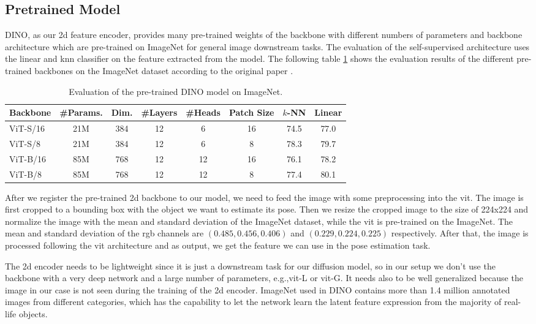 \documentclass[12pt,DIV14,BCOR12mm,a4paper,footinclude=false,headinclude,parskip=half-,twoside,openright,cleardoublepage=empty,toc=index,bibliography=totoc,listof=totoc]{scrreprt}
\numberwithin{equation}{chapter}
\begin{document}
\subsection{Pretrained Model} 
DINO, as our \gls{2d} feature encoder, provides many pre-trained weights of the backbone with different numbers of parameters and backbone architecture which are pre-trained on ImageNet for general image downstream tasks. The evaluation of the self-supervised architecture uses the linear and \gls{knn} classifier on the feature extracted from the model. The following table \ref{tab:dino} shows the evaluation results of the different pre-trained backbones on the ImageNet dataset according to the original paper \cite{caron2021emerging}.
\begin{table}[ht]
  \centering
  \caption{Evaluation of the pre-trained DINO model on ImageNet.}
  \label{tab:dino}
  \begin{tabular}{l | c c c c c c c}
      \toprule
      Backbone & \#Params. & Dim. & \#Layers & \#Heads & Patch Size & $k$-NN & Linear\\
      \midrule
      ViT-S/16 & 21M & 384 & 12 & 6 & 16 & 74.5 & 77.0 \\
      ViT-S/8 & 21M & 384 & 12 & 6 & 8 & 78.3 & 79.7 \\
      ViT-B/16 & 85M & 768 & 12 & 12 & 16 & 76.1 & 78.2 \\
      ViT-B/8 & 85M & 768 & 12 & 12 & 8 & 77.4 & 80.1 \\
      \bottomrule
  \end{tabular}
\end{table}

After we register the pre-trained \gls{2d} backbone to our model, we need to feed the image with some preprocessing into the \gls{vit}. The image is first cropped to a bounding box with the object we want to estimate its pose. Then we resize the cropped image to the size of 224x224 and normalize the image with the mean and standard deviation of the ImageNet dataset, while the \gls{vit} is pre-trained on the ImageNet. The mean and standard deviation of the \gls{rgb} channels are $(0.485, 0.456, 0.406)$ and $(0.229, 0.224, 0.225)$ respectively. After that, the image is processed following the \gls{vit} architecture and as output, we get the feature we can use in the pose estimation task. 

The \gls{2d} encoder needs to be lightweight since it is just a downstream task for our diffusion model, so in our setup we don't use the backbone with a very deep network and a large number of parameters, e.g.,\gls{vit}-L or \gls{vit}-G. It needs also to be well generalized because the image in our case is not seen during the training of the \gls{2d} encoder. ImageNet used in DINO contains more than 1.4 million annotated images from different categories, which has the capability to let the network learn the latent feature expression from the majority of real-life objects. 
\end{document}
